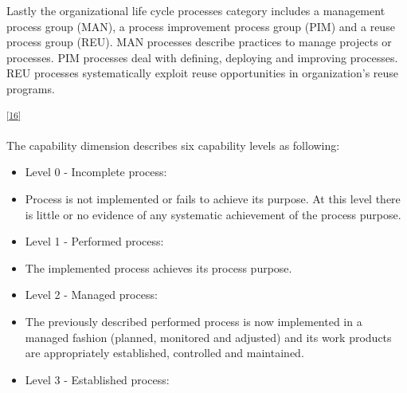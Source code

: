 {Lastly the organizational life cycle processes category includes a
management process group (MAN), a process improvement process group
(PIM) and a reuse process group (REU). MAN processes describe practices
to manage projects or processes. PIM processes deal with defining,
deploying and improving processes. REU processes systematically exploit
reuse opportunities in organization's reuse programs.}

\textsuperscript{\protect\hyperlink{ftnt16}{{[}16{]}}}

{The capability dimension describes six capability levels as following:}

\begin{itemize}
\tightlist
\item
  {Level 0 - Incomplete process:}
\end{itemize}

\begin{itemize}
\tightlist
\item
  {Process is not implemented or fails to achieve its purpose. At this
  level there is little or no evidence of any systematic achievement of
  the process purpose.}
\end{itemize}

\begin{itemize}
\tightlist
\item
  {Level 1 - Performed process:}
\end{itemize}

\begin{itemize}
\tightlist
\item
  {The implemented process achieves its process purpose.}
\end{itemize}

\begin{itemize}
\tightlist
\item
  {Level 2 - Managed process:}
\end{itemize}

\begin{itemize}
\tightlist
\item
  {The previously described performed process is now implemented in a
  managed fashion (planned, monitored and adjusted) and its work
  products are appropriately established, controlled and maintained.}
\end{itemize}

\begin{itemize}
\tightlist
\item
  {Level 3 - Established process:}
\end{itemize}

